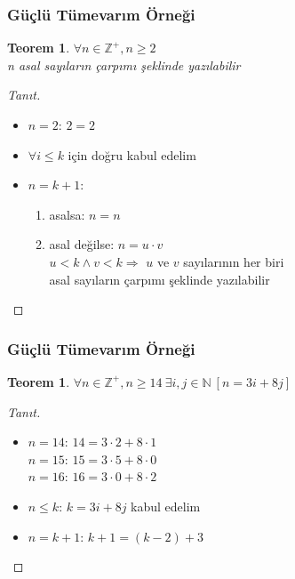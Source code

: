 \documentclass[dvipsnames]{beamer}
\theoremstyle{definition}
\theoremstyle{example}
\theoremstyle{plain}
\newtheorem{teorem}[theorem]{Teorem}
\begin{document}
\begin{frame}
  \frametitle{Güçlü Tümevarım Örneği}

  \begin{teorem}
    $\forall n \in \mathbb{Z}^+, n \geq 2$\\
      n asal sayıların çarpımı şeklinde yazılabilir
  \end{teorem}

  \pause
  \begin{proof}[Tanıt]
    \begin{itemize}
      \item $n=2$: $2=2$

      \pause
      \item $\forall i \leq k$ için doğru kabul edelim

      \pause
      \item $n=k+1$:
      \begin{enumerate}
        \item asalsa: $n=n$

        \pause
        \item asal değilse: $n=u \cdot v$\\
          $u < k \wedge v < k \Rightarrow$ $u$ ve $v$ sayılarının her biri\\
          asal sayıların çarpımı şeklinde yazılabilir
      \end{enumerate}
    \end{itemize}
  \end{proof}
\end{frame}

\begin{frame}
  \frametitle{Güçlü Tümevarım Örneği}

  \begin{teorem}
    $\forall n \in \mathbb{Z}^+, n \geq 14~\exists i,j \in \mathbb{N}~[n=3i+8j]$
  \end{teorem}

  \pause
  \begin{proof}[Tanıt]
    \begin{itemize}
      \item $n=14$: $14=3 \cdot 2 + 8 \cdot 1$\\
        $n=15$: $15=3 \cdot 5 + 8 \cdot 0$\\
        $n=16$: $16=3 \cdot 0 + 8 \cdot 2$

      \pause
      \item $n \leq k$: $k=3i+8j$ kabul edelim

      \pause
      \item $n=k+1$: $k+1=(k-2)+3$
    \end{itemize}
  \end{proof}
\end{frame}
\end{document}

